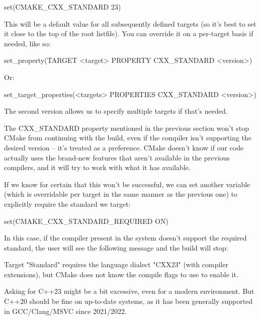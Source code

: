 \begin{cmake}
set(CMAKE_CXX_STANDARD 23)
\end{cmake}

This will be a default value for all subsequently defined targets (so it’s best to set it close to the top of the root listfile). You can override it on a per-target basis if needed, like so:

\begin{shell}
set_property(TARGET <target> PROPERTY CXX_STANDARD <version>)
\end{shell}

Or:

\begin{shell}
set_target_properties(<targets> PROPERTIES CXX_STANDARD <version>)
\end{shell}

The second version allows us to specify multiple targets if that’s needed.


The CXX\_STANDARD property mentioned in the previous section won’t stop CMake from continuing with the build, even if the compiler isn’t supporting the desired version – it’s treated as a preference. CMake doesn’t know if our code actually uses the brand-new features that aren’t available in the previous compilers, and it will try to work with what it has available.

If we know for certain that this won’t be successful, we can set another variable (which is overridable per target in the same manner as the previous one) to explicitly require the standard we target:

\begin{cmake}
set(CMAKE_CXX_STANDARD_REQUIRED ON)
\end{cmake}

In this case, if the compiler present in the system doesn’t support the required standard, the user will see the following message and the build will stop:

\begin{shell}
Target "Standard" requires the language dialect "CXX23" (with compiler extensions), but CMake does not know the compile flags to use to enable it.
\end{shell}

Asking for C++23 might be a bit excessive, even for a modern environment. But C++20 should be fine on up-to-date systems, as it has been generally supported in GCC/Clang/MSVC since 2021/2022.


